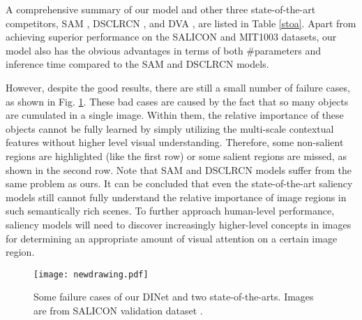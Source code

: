 A comprehensive summary of our model and other three state-of-the-art competitors, \ie SAM \cite{cornia2016predicting}, DSCLRCN \cite{liu2016deep}, and DVA \cite{wang2017deep}, are listed in Table \ref{stoa}. Apart from achieving superior performance on the SALICON and MIT1003 datasets, our model also has the obvious advantages in terms of both \#parameters and inference time compared to the SAM and DSCLRCN models. 

However, despite the good results, there are still a small number of failure cases, as shown in Fig. \ref{fig:fc1}. These bad cases are caused by the fact that so many objects are cumulated in a single image. Within them, the relative importance of these objects cannot be fully learned by simply utilizing the multi-scale contextual features without higher level visual understanding. Therefore, some non-salient regions are highlighted (like the first row) or some salient regions are missed, as shown in the second row. Note that SAM and DSCLRCN models suffer from the same problem as ours. It can be concluded that even the state-of-the-art saliency models still cannot fully understand the relative importance of image regions in such semantically rich scenes. To further approach human-level performance, saliency models will need to discover increasingly higher-level concepts in images for determining an appropriate amount of visual attention on a certain image region.




\begin{figure}[h]
	\centering
	\scriptsize
	\texttt{[image: newdrawing.pdf]}
	\caption{ Some failure cases of our DINet and two state-of-the-arts. Images are from SALICON validation dataset \cite{jiang2015salicon}.
	}
	\label{fig:fc1}
	\vspace{-4mm}
\end{figure}















